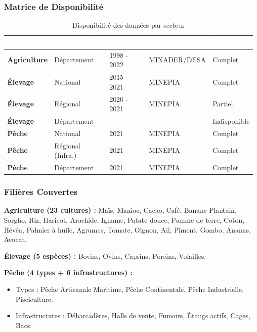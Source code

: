 \documentclass[11pt,a4paper]{article}
\begin{document}
\subsubsection*{Matrice de Disponibilité}
\begin{table}[H]
    \centering
    \small
    \renewcommand{\arraystretch}{1.2}
    \begin{tabularx}{\textwidth}{|l|l|l|l|X|}
    \hline
    \rowcolor{NavyBlue} \textcolor{white}{\textbf{Secteur}} & \textcolor{white}{\textbf{Granularité}} & \textcolor{white}{\textbf{Années}} & \textcolor{white}{\textbf{Source}} & \textcolor{white}{\textbf{État}} \\ \hline
    \textbf{Agriculture} & Département & 1998 - 2022 & MINADER/DESA & Complet \\ \hline
    \textbf{Élevage} & National & 2015 - 2021 & MINEPIA & Complet \\ \hline
    \textbf{Élevage} & Régional & 2020 - 2021 & MINEPIA & Partiel \\ \hline
    \textbf{Élevage} & Département & - & - & Indisponible \\ \hline
    \textbf{Pêche} & National & 2021 & MINEPIA & Complet \\ \hline
    \textbf{Pêche} & Régional (Infra.) & 2021 & MINEPIA & Complet \\ \hline
    \textbf{Pêche} & Département & 2021 & MINEPIA & Complet \\ \hline
    \end{tabularx}
    \caption{Disponibilité des données par secteur}
\end{table}

\subsubsection*{Filières Couvertes}
\noindent \textbf{Agriculture (23 cultures) :} Maïs, Manioc, Cacao, Café, Banane Plantain, Sorgho, Riz, Haricot, Arachide, Igname, Patate douce, Pomme de terre, Coton, Hévéa, Palmier à huile, Agrumes, Tomate, Oignon, Ail, Piment, Gombo, Ananas, Avocat.

\vspace{0.5em}
\noindent \textbf{Élevage (5 espèces) :} Bovins, Ovins, Caprins, Porcins, Volailles.

\vspace{0.5em}
\noindent \textbf{Pêche (4 types + 6 infrastructures) :}
\begin{itemize}
    \item Types : Pêche Artisanale Maritime, Pêche Continentale, Pêche Industrielle, Pisciculture.
    \item Infrastructures : Débarcadères, Halls de vente, Fumoirs, Étangs actifs, Cages, Bacs.
\end{itemize}
\end{document}

